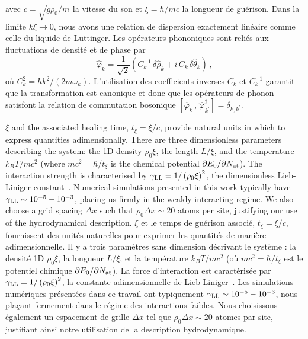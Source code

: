 \documentclass[aps,prd,notitlepage,amsfonts,amssymb,amsmath,nofootinbib,superscriptaddress,longbibliography]{revtex4-2}
\newcommand{\trad}[1]{\textcolor{tradcolor}{#1}}
\begin{document}
{avec $c = \sqrt{g \rho_{0} / m}$ la vitesse du son et $\xi = \hbar/mc$ la longueur de guérison. Dans la limite $k \xi \xrightarrow{} 0$, nous avons une relation de dispersion exactement linéaire comme celle du liquide de Luttinger. Les opérateurs phononiques sont reliés aux fluctuations de densité et de phase par
\begin{equation}
	\hat{\varphi}_{k} = \frac{1}{\sqrt{2}} \left( C_{k}^{-1} \, \delta\hat{\rho}_{k} + i \, C_{k} \, \delta\hat{\theta}_{k} \right) \,,
\end{equation}
où $C_{k}^{2} = \hbar k^{2}/\left(2m \omega_{k}\right)$. L'utilisation des coefficients inverses $C_{k}$ et $C_{k}^{-1}$ garantit que la transformation est canonique et donc que les opérateurs de phonon satisfont la relation de commutation bosonique $\left[ \hat{\varphi}_{k} \,,\, \hat{\varphi}_{k^{\prime}}^{\dagger} \right] = \delta_{k,k^{\prime}}$.
} 

$\xi$ and the associated healing time, $t_{\xi} = \xi/c$, provide natural units in which to express quantities adimensionally.
There are three dimensionless parameters describing the system: the 1D density $\rho_{0} \xi$, the length $L/\xi$, and the temperature $k_{B}T/mc^{2}$ (where $mc^{2} = \hbar/t_{\xi}$ is the chemical potential $\partial E_{0}/\partial N_{\rm at}$).
The interaction strength is characterised by $\gamma_{\rm LL} = 1/\left(\rho_{0} \xi\right)^{2}$, the dimensionless Lieb-Liniger constant~\cite{Lieb1963,Petrov2004}. Numerical simulations presented in this work typically have $\gamma_{\rm LL} \sim 10^{-5} - 10^{-3}$, placing us firmly in the weakly-interacting regime. We also choose a grid spacing $\Delta x$ such that $\rho_0 \Delta x \sim 20$ atoms per site, justifying our use of the hydrodynamical description. 
\trad{
$\xi$ et le temps de guérison associé, $t_{\xi} = \xi/c$, fournissent des unités naturelles pour exprimer les quantités de manière adimensionnelle. Il y a trois paramètres sans dimension décrivant le système : la densité 1D $\rho_{0} \xi$, la longueur $L/\xi$, et la température $k_{B}T/mc^{2}$ (où $mc^{2} = \hbar/t_{\xi}$ est le potentiel chimique $\partial E_{0}/\partial N_{\rm at}$). La force d'interaction est caractérisée par $\gamma_{\rm LL} = 1/\left(\rho_{0} \xi\right)^{2}$, la constante adimensionnelle de Lieb-Liniger~\cite{Lieb1963,Petrov2004}. Les simulations numériques présentées dans ce travail ont typiquement $\gamma_{\rm LL} \sim 10^{-5} - 10^{-3}$, nous plaçant fermement dans le régime des interactions faibles. Nous choisissons également un espacement de grille $\Delta x$ tel que $\rho_0 \Delta x \sim 20$ atomes par site, justifiant ainsi notre utilisation de la description hydrodynamique.
}
\end{document}
